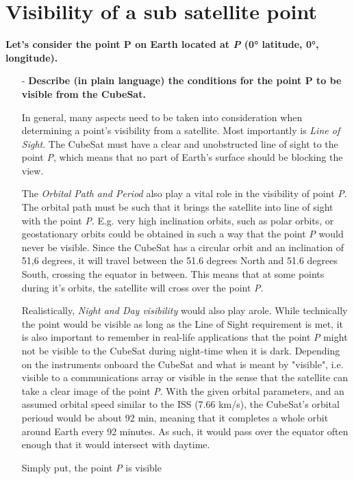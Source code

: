 \section{Visibility of a sub satellite point} 

 
\textbf{Let’s consider the point P on Earth located at \textit{P} (0° latitude, 0°, longitude). }
\begin{itemize}
    \item[-] \textbf{Describe (in plain language) the conditions for the point P to be visible from the CubeSat.}

    In general, many aspects need to be taken into consideration when determining a point's visibility from a satellite. 
    Most importantly is \textit{Line of Sight}. 
    The CubeSat must have a clear and unobstructed line of sight to the point \textit{P}, which means that no part of Earth's surface should be blocking the view.

    The \textit{Orbital Path and Period} also play a vital role in the visibility of point \textit{P}. 
    The orbital path must be such that it brings the satellite into line of sight with the point \textit{P}. 
    E.g. very high inclination orbits, such as polar orbits, or geostationary orbits could be obtained in such a way that the point \textit{P} would never be visible.
    Since the CubeSat has a circular orbit and an inclination of 51,6 degrees, it will travel between the 51.6 degrees North and 51.6 degrees South, crossing the equator in between. 
    This means that at some points during it's orbits, the satellite will cross over the point \textit{P}.

    Realistically, \textit{Night and Day visibility} would also play arole. 
    While technically the point would be visible as long as the Line of Sight requirement is met, it is also important to remember in real-life applications that the point \textit{P} might not be visible to the CubeSat during night-time when it is dark.
    Depending on the instruments onboard the CubeSat and what is meant by "visible", i.e. visible to a communications array or visible in the sense that the satellite can take a clear image of the point \textit{P}.
    With the given orbital parameters, and an assumed orbital speed similar to the ISS (7.66 km/s), the CubeSat's orbital perioud would be about 92 min, meaning that it completes a whole orbit around Earth every 92 minutes. 
    As such, it would pass over the equator often enough that it would intersect with daytime.
    
    Simply put, the point \textit{P} is visible


\end{itemize}
